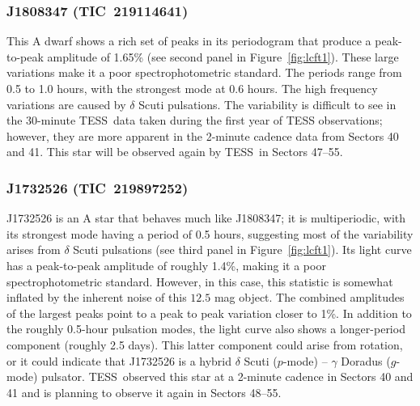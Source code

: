 \documentclass[twocolumn]{aastex631}
\newcommand{\webb}{JWST}
\newcommand{\tess}{TESS}
\begin{document}

\subsubsection{J1808347 (TIC~219114641)}

This A dwarf shows a rich set of peaks in its periodogram that produce a peak-to-peak amplitude of 1.65\% (see second panel in Figure~\ref{fig:lcft1}). These large variations  make it a poor spectrophotometric standard. The periods range from 0.5 to 1.0 hours, with the strongest mode at 0.6 hours.  The high frequency variations are caused by $\delta$ Scuti pulsations.  The variability is difficult to see in the 30-minute \tess\ data taken during the first year of TESS observations; however, they are more apparent in the 2-minute cadence data from Sectors 40 and 41.  This star will be observed again by \tess\ in Sectors 47--55.  





\subsubsection{J1732526 (TIC~219897252)}

J1732526 is an A star that behaves much like J1808347; it is multiperiodic, with its strongest mode having a period of 0.5 hours, suggesting most of the variability arises from $\delta$ Scuti pulsations (see third panel in Figure~\ref{fig:lcft1}). Its light curve has a peak-to-peak amplitude of roughly 1.4\%, making it a poor spectrophotometric standard. However, in this case, this statistic is somewhat inflated by the inherent noise of this $12.5$ mag object. The combined amplitudes of the largest peaks point to a peak to peak variation closer to 1\%.  In addition to the roughly 0.5-hour pulsation modes, the light curve also shows a longer-period component (roughly 2.5 days). This latter component could arise from rotation, or it could indicate that J1732526 is a hybrid $\delta$ Scuti ($p$-mode) -- $\gamma$ Doradus ($g$-mode) pulsator. \tess\ observed this star at a 2-minute cadence in Sectors 40 and 41 and is planning to observe it again in Sectors 48--55.
\end{document}
